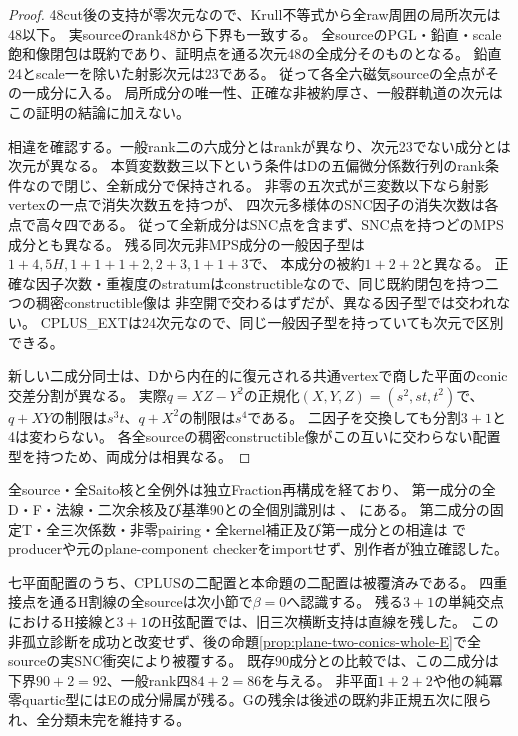 \documentclass[a4paper,11pt]{ltjsarticle}
\theoremstyle{definition}
\begin{document}
\begin{proof}
48cut後の支持が零次元なので、Krull不等式から全raw周囲の局所次元は48以下。
実sourceのrank48から下界も一致する。
全sourceのPGL・鉛直・scale飽和像閉包は既約であり、証明点を通る次元48の全成分そのものとなる。
鉛直24とscale一を除いた射影次元は23である。
従って各全六磁気sourceの全点がその一成分に入る。
局所成分の唯一性、正確な非被約厚さ、一般群軌道の次元はこの証明の結論に加えない。

相違を確認する。一般rank二の六成分とはrankが異なり、次元23でない成分とは次元が異なる。
本質変数数三以下という条件はDの五偏微分係数行列のrank条件なので閉じ、全新成分で保持される。
非零の五次式が三変数以下なら射影vertexの一点で消失次数五を持つが、
四次元多様体のSNC因子の消失次数は各点で高々四である。
従って全新成分はSNC点を含まず、SNC点を持つどのMPS成分とも異なる。
残る同次元非MPS成分の一般因子型は$1+4,5H,1+1+1+2,2+3,1+1+3$で、
本成分の被約$1+2+2$と異なる。
正確な因子次数・重複度のstratumはconstructibleなので、同じ既約閉包を持つ二つの稠密constructible像は
非空開で交わるはずだが、異なる因子型では交われない。
CPLUS\_EXTは24次元なので、同じ一般因子型を持っていても次元で区別できる。

新しい二成分同士は、Dから内在的に復元される共通vertexで商した平面のconic交差分割が異なる。
実際$q=XZ-Y^2$の正規化$(X,Y,Z)=(s^2,st,t^2)$で、
$q+XY$の制限は$s^3t$、$q+X^2$の制限は$s^4$である。
二因子を交換しても分割$3+1$と4は変わらない。
各全sourceの稠密constructible像がこの互いに交わらない配置型を持つため、両成分は相異なる。
\end{proof}

全source・全Saito核と全例外は独立Fraction再構成を経ており、
第一成分の全D・F・法線・二次余核及び基準90との全個別識別は
、
にある。
第二成分の固定T・全三次係数・非零pairing・全kernel補正及び第一成分との相違は
で
producerや元のplane-component checkerをimportせず、別作者が独立確認した。

七平面配置のうち、CPLUSの二配置と本命題の二配置は被覆済みである。
四重接点を通るH割線の全sourceは次小節で$\beta=0$へ認識する。
残る$3+1$の単純交点におけるH接線と$3+1$のH弦配置では、旧三次横断支持は直線を残した。
この非孤立診断を成功と改変せず、後の命題\ref{prop:plane-two-conics-whole-E}で全sourceの実SNC衝突により被覆する。
既存90成分との比較では、この二成分は下界$90+2=92$、一般rank四$84+2=86$を与える。
非平面$1+2+2$や他の純冪零quartic型にはEの成分帰属が残る。Gの残余は後述の既約非正規五次に限られ、全分類未完を維持する。
\end{document}
